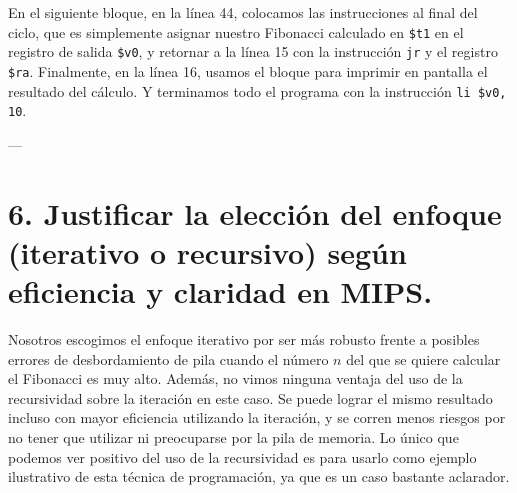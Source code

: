 \documentclass{article}
\begin{document}
En el siguiente bloque, en la línea 44, colocamos las instrucciones al final del ciclo, que es simplemente asignar nuestro Fibonacci calculado en \texttt{\$t1} en el registro de salida \texttt{\$v0}, y retornar a la línea 15 con la instrucción \texttt{jr} y el registro \texttt{\$ra}.
Finalmente, en la línea 16, usamos el bloque para imprimir en pantalla el resultado del cálculo. Y terminamos todo el programa con la instrucción \texttt{li \$v0, 10}.

---

\section*{6. Justificar la elección del enfoque (iterativo o recursivo) según eficiencia y claridad en MIPS.}

Nosotros escogimos el enfoque iterativo por ser más robusto frente a posibles errores de desbordamiento de pila cuando el número $n$ del que se quiere calcular el Fibonacci es muy alto. Además, no vimos ninguna ventaja del uso de la recursividad sobre la iteración en este caso. Se puede lograr el mismo resultado incluso con mayor eficiencia utilizando la iteración, y se corren menos riesgos por no tener que utilizar ni preocuparse por la pila de memoria. Lo único que podemos ver positivo del uso de la recursividad es para usarlo como ejemplo ilustrativo de esta técnica de programación, ya que es un caso bastante aclarador.
\end{document}
